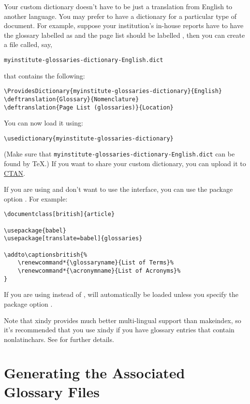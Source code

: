 \documentclass[report,inlinetitle]{nlctdoc}
\begin{document}
Your custom dictionary doesn't have to be just a translation from
English to another language. You may prefer to have a dictionary for
a particular type of document. For example, suppose your
institution's in-house reports have to have the glossary labelled as
 and the page list should be labelled
, then you can create a file called, say,
\begin{verbatim}
myinstitute-glossaries-dictionary-English.dict
\end{verbatim}
that contains the following:
\begin{verbatim}
\ProvidesDictionary{myinstitute-glossaries-dictionary}{English}
\deftranslation{Glossary}{Nomenclature}
\deftranslation{Page List (glossaries)}{Location}
\end{verbatim}
You can now load it using:
\begin{verbatim}
\usedictionary{myinstitute-glossaries-dictionary}
\end{verbatim}
(Make sure that \texttt{myinstitute-glossaries-dictionary-English.dict}
can be found by \TeX.) If you want to share your custom dictionary,
you can upload it to \href{http://www.ctan.org/}{CTAN}.

If you are using  and don't want to use the
 interface, you can use the package
option . For example:
\begin{verbatim}
\documentclass[british]{article}

\usepackage{babel}
\usepackage[translate=babel]{glossaries}

\addto\captionsbritish{%
    \renewcommand*{\glossaryname}{List of Terms}%
    \renewcommand*{\acronymname}{List of Acronyms}%
}
\end{verbatim}

If you are using  instead of , 
 will automatically be loaded unless
you specify the package option .

Note that \gls{xindy} provides much better multi-lingual support
than \gls{makeindex}, so it's recommended that you use \gls*{xindy}
if you have glossary entries that contain 
\glspl{nonlatinchar}. See  for further
details.

\section{Generating the Associated Glossary Files}
\label{sec:makeglossaries}
\end{document}
